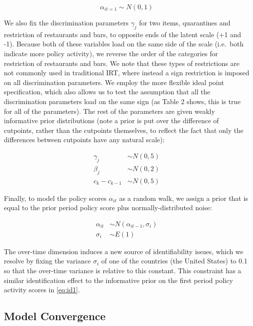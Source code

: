 \documentclass[]{article}
\begin{document}
\begin{equation}
\alpha_{it=1} \sim N(0,1)
\label{eq:id1}
\end{equation}

We also fix the discrimination parameters \(\gamma_j\) for two items, quarantines and restriction of restaurants and bars, to opposite ends of the latent scale (+1 and -1). Because both of these variables load on the same side of the scale (i.e.~both indicate more policy activity), we reverse the order of the categories for restriction of restaurants and bars. We note that these types of restrictions are not commonly used in traditional IRT, where instead a sign restriction is imposed on all discrimination parameters. We employ the more flexible ideal point specification, which also allows us to test the assumption that all the discrimination parameters load on the same sign (as Table 2 shows, this is true for all of the parameters). The rest of the parameters are given weakly informative prior distributions (note a prior is put over the difference of cutpoints, rather than the cutpoints themselves, to reflect the fact that only the differences between cutpoints have any natural scale):

\begin{align}
\gamma_j &\sim N(0,5)\\
\beta_j &\sim N(0,2)\\
c_k - c_{k-1} &\sim N(0,5)
\label{eq:id2}
\end{align}

Finally, to model the policy scores \(\alpha_{it}\) as a random walk, we assign a prior that is equal to the prior period policy score plus normally-distributed noise:

\begin{align}
\alpha_{it} &\sim N(\alpha_{it-1},\sigma_i)\\
\sigma_i &\sim E(1)
\label{eq:rwc}
\end{align}

The over-time dimension induces a new source of identifiability issues, which we resolve by fixing the variance \(\sigma_i\) of one of the countries (the United States) to 0.1 so that the over-time variance is relative to this constant. This constraint has a similar identification effect to the informative prior on the first period policy activity scores in \eqref{eq:id1}.

\hypertarget{model-convergence}{%
\subsection*{Model Convergence}\label{model-convergence}}
\end{document}
